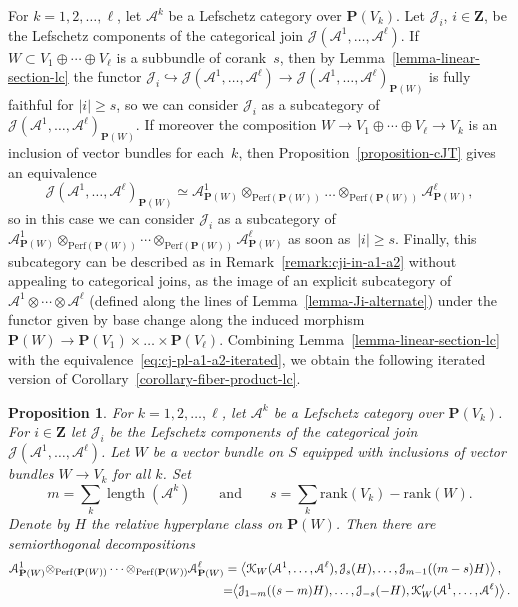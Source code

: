 \documentclass[11pt, reqno]{amsart}
\numberwithin{equation}{section}
\theoremstyle{plain}
\newtheorem{proposition}[theorem]{Proposition}
\theoremstyle{definition}
\newcommand{\Perf}{\mathrm{Perf}}
\DeclareMathOperator{\length}{\mathrm{length}}
\newcommand{\llangle}{\left \langle}
\newcommand{\rrangle}{\right \rangle}
\newcommand{\rank}{\mathrm{rank}}
\newcommand{\cA}{\mathcal{A}}
\newcommand{\cJ}{\mathcal{J}}
\newcommand{\cK}{\mathcal{K}}
\newcommand{\bZ}{\mathbf{Z}}
\newcommand{\bP}{\mathbf{P}}
\begin{document}
For $k=1,2, \dots, \ell$, let $\cA^k$ be a Lefschetz category over $\bP(V_k)$. 
Let $\cJ_i$, $i \in \bZ$, be the Lefschetz components of the categorical join 
$\cJ(\cA^1, \dots, \cA^\ell)$. 
If $W \subset V_1 \oplus \cdots \oplus V_\ell$ is a subbundle of corank~$s$,
then by Lemma~\ref{lemma-linear-section-lc} the functor $\cJ_i \hookrightarrow \cJ(\cA^1,\dots,\cA^\ell) \to \cJ(\cA^1,\dots,\cA^\ell)_{\bP(W)}$ is fully faithful for $|i| \ge s$, 
so we can consider $\cJ_i$ as a subcategory of $\cJ(\cA^1,\dots,\cA^\ell)_{\bP(W)}$.
If moreover the composition $W \to V_1 \oplus \cdots \oplus V_{\ell} \to V_k$ is 
an inclusion of vector bundles for each~$k$, then Proposition~\ref{proposition-cJT} gives an equivalence
\begin{equation}
\label{eq:cj-pl-a1-a2-iterated}
\cJ(\cA^1, \dots, \cA^\ell)_{\bP(W)} \simeq \cA^1_{\bP(W)} \otimes_{\Perf(\bP(W))} \dots \otimes_{\Perf(\bP(W))} \cA^\ell_{\bP(W)} , 
\end{equation} 
so in this case we can consider $\cJ_i$ as a subcategory of $\cA^1_{\bP(W)} \otimes_{\Perf({\bP(W)})} \cdots \otimes_{\Perf({\bP(W)})} \cA^{\ell}_{\bP(W)}$ as soon as~$|i| \ge s$.
Finally, this subcategory can be described as in Remark~\ref{remark:cji-in-a1-a2} without appealing to 
categorical joins, as the image of an explicit subcategory of 
$\cA^1 \otimes \cdots \otimes \cA^\ell$ (defined along the lines of Lemma~\ref{lemma-Ji-alternate}) 
under the functor given by base change along the induced morphism~$\bP(W) \to \bP(V_1) \times \dots \times \bP(V_\ell)$.
Combining Lemma~\ref{lemma-linear-section-lc} with the equivalence~\eqref{eq:cj-pl-a1-a2-iterated}, 
we obtain the following iterated version of Corollary~\ref{corollary-fiber-product-lc}. 

\begin{proposition}
\label{proposition-iterated-fiber-product-lc}
For $k=1, 2, \dots, \ell$, let $\cA^k$ be a Lefschetz category over $\bP(V_k)$. 
For $i \in \bZ$ let $\cJ_i$ be the Lefschetz components of the categorical join $\cJ(\cA^1, \dots, \cA^\ell)$. 
Let $W$ be a vector bundle on $S$ equipped with inclusions of vector 
bundles $W \to V_k$ for all $k$. 
Set 
\begin{equation*}
m = \sum_k \length(\cA^k) 
\qquad\text{and}\qquad
s =  \sum_k \rank(V_k) - \rank(W) . 
\end{equation*}
Denote
by $H$ the relative hyperplane class on $\bP(W)$.
Then there are semiorthogonal decompositions 
\begin{align*}
\cA^1_{\bP(W)}{ \otimes_{\Perf(\bP(W))}} \cdots {\otimes_{\Perf(\bP(W))}} \cA^\ell_{\bP(W)} & = 
\llangle \cK_W(\cA^1, \dots, \cA^\ell), \cJ_s(H), \dots, \cJ_{m-1}((m-s)H) \rrangle ,    \\
&  \hspace{-3.5pt} = \hspace{-3pt} 
\llangle 
\cJ_{1-m}((s-m)H), \dots, \cJ_{-s}(-H), \cK'_W(\cA^1, \dots, \cA^\ell)
\rrangle . 
\end{align*}
\end{proposition}
\end{document}
